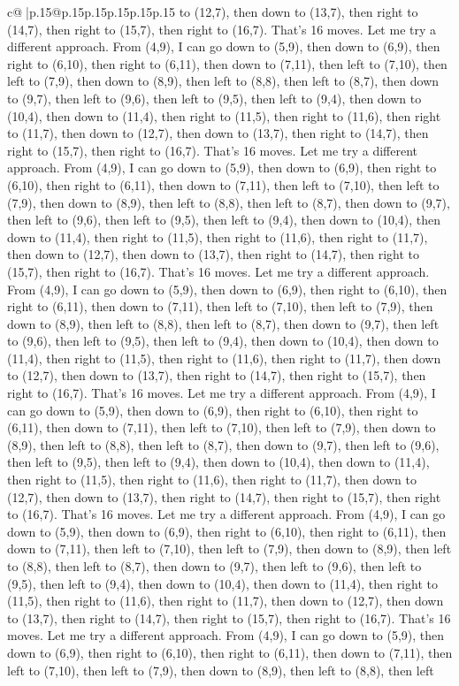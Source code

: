 \documentclass{article}
\begin{document}
{\begin{supertabular}{c@{$\;$}|p{.15\linewidth}@{}p{.15\linewidth}p{.15\linewidth}p{.15\linewidth}p{.15\linewidth}p{.15\linewidth}}
{{{to (12,7), then down to (13,7), then right to (14,7), then right to (15,7), then right to (16,7). That's 16 moves. Let me try a different approach. From (4,9), I can go down to (5,9), then down to (6,9), then right to (6,10), then right to (6,11), then down to (7,11), then left to (7,10), then left to (7,9), then down to (8,9), then left to (8,8), then left to (8,7), then down to (9,7), then left to (9,6), then left to (9,5), then left to (9,4), then down to (10,4), then down to (11,4), then right to (11,5), then right to (11,6), then right to (11,7), then down to (12,7), then down to (13,7), then right to (14,7), then right to (15,7), then right to (16,7). That's 16 moves. Let me try a different approach. From (4,9), I can go down to (5,9), then down to (6,9), then right to (6,10), then right to (6,11), then down to (7,11), then left to (7,10), then left to (7,9), then down to (8,9), then left to (8,8), then left to (8,7), then down to (9,7), then left to (9,6), then left to (9,5), then left to (9,4), then down to (10,4), then down to (11,4), then right to (11,5), then right to (11,6), then right to (11,7), then down to (12,7), then down to (13,7), then right to (14,7), then right to (15,7), then right to (16,7). That's 16 moves. Let me try a different approach. From (4,9), I can go down to (5,9), then down to (6,9), then right to (6,10), then right to (6,11), then down to (7,11), then left to (7,10), then left to (7,9), then down to (8,9), then left to (8,8), then left to (8,7), then down to (9,7), then left to (9,6), then left to (9,5), then left to (9,4), then down to (10,4), then down to (11,4), then right to (11,5), then right to (11,6), then right to (11,7), then down to (12,7), then down to (13,7), then right to (14,7), then right to (15,7), then right to (16,7). That's 16 moves. Let me try a different approach. From (4,9), I can go down to (5,9), then down to (6,9), then right to (6,10), then right to (6,11), then down to (7,11), then left to (7,10), then left to (7,9), then down to (8,9), then left to (8,8), then left to (8,7), then down to (9,7), then left to (9,6), then left to (9,5), then left to (9,4), then down to (10,4), then down to (11,4), then right to (11,5), then right to (11,6), then right to (11,7), then down to (12,7), then down to (13,7), then right to (14,7), then right to (15,7), then right to (16,7). That's 16 moves. Let me try a different approach. From (4,9), I can go down to (5,9), then down to (6,9), then right to (6,10), then right to (6,11), then down to (7,11), then left to (7,10), then left to (7,9), then down to (8,9), then left to (8,8), then left to (8,7), then down to (9,7), then left to (9,6), then left to (9,5), then left to (9,4), then down to (10,4), then down to (11,4), then right to (11,5), then right to (11,6), then right to (11,7), then down to (12,7), then down to (13,7), then right to (14,7), then right to (15,7), then right to (16,7). That's 16 moves. Let me try a different approach. From (4,9), I can go down to (5,9), then down to (6,9), then right to (6,10), then right to (6,11), then down to (7,11), then left to (7,10), then left to (7,9), then down to (8,9), then left to (8,8), then left }}}
\end{supertabular}}
\end{document}
